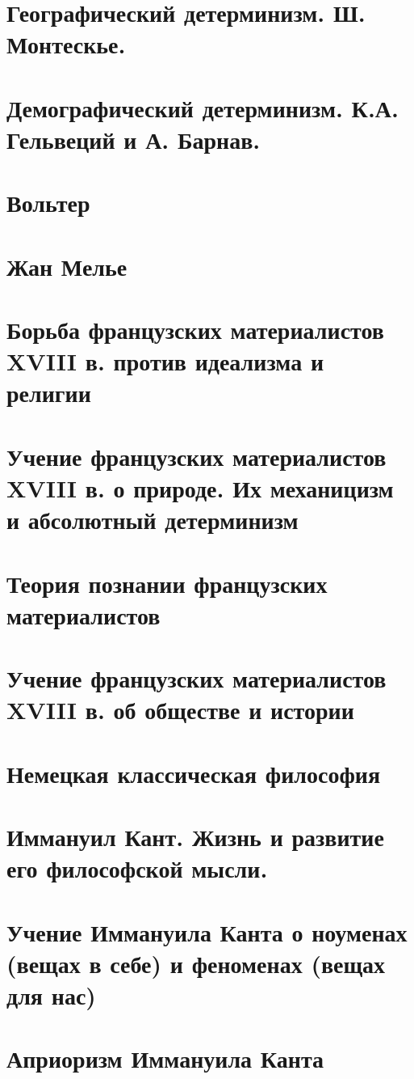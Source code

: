 \section{Географический детерминизм. Ш. Монтескье.}
\section{Демографический детерминизм.  К.А. Гельвеций и А. Барнав.}
\section{Вольтер}
\section{Жан Мелье}
\section{Борьба французских материалистов XVIII в. против идеализма и религии}
\section{Учение французских материалистов XVIII в. о природе. Их механицизм и абсолютный детерминизм}
\section{Теория познании французских материалистов}
\section{Учение французских материалистов XVIII в.  об обществе и истории}
\section{Немецкая классическая философия}
\section{Иммануил Кант.  Жизнь и развитие его философской мысли.}
\section{Учение Иммануила Канта о ноуменах (вещах в себе) и феноменах (вещах для нас)}
\section{Априоризм Иммануила Канта}
